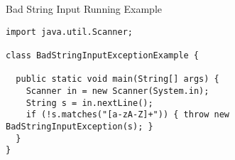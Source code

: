 \begin{cl}[]{Bad String Input Running Example}
\begin{lstlisting}[language=MyJava]
import java.util.Scanner;

class BadStringInputExceptionExample {
  
  public static void main(String[] args) {
    Scanner in = new Scanner(System.in);
    String s = in.nextLine();
    if (!s.matches("[a-zA-Z]+")) { throw new BadStringInputException(s); }
  }
}
\end{lstlisting}
\end{cl}

